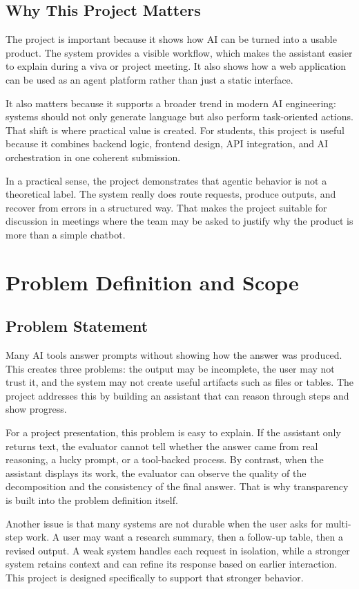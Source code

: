 \documentclass[11pt,oneside]{report}
\begin{document}
\section{Why This Project Matters}
The project is important because it shows how AI can be turned into a usable product. The system provides a visible workflow, which makes the assistant easier to explain during a viva or project meeting. It also shows how a web application can be used as an agent platform rather than just a static interface.

It also matters because it supports a broader trend in modern AI engineering: systems should not only generate language but also perform task-oriented actions. That shift is where practical value is created. For students, this project is useful because it combines backend logic, frontend design, API integration, and AI orchestration in one coherent submission.

In a practical sense, the project demonstrates that agentic behavior is not a theoretical label. The system really does route requests, produce outputs, and recover from errors in a structured way. That makes the project suitable for discussion in meetings where the team may be asked to justify why the product is more than a simple chatbot.

\chapter{Problem Definition and Scope}
\section{Problem Statement}
Many AI tools answer prompts without showing how the answer was produced. This creates three problems: the output may be incomplete, the user may not trust it, and the system may not create useful artifacts such as files or tables. The project addresses this by building an assistant that can reason through steps and show progress.

For a project presentation, this problem is easy to explain. If the assistant only returns text, the evaluator cannot tell whether the answer came from real reasoning, a lucky prompt, or a tool-backed process. By contrast, when the assistant displays its work, the evaluator can observe the quality of the decomposition and the consistency of the final answer. That is why transparency is built into the problem definition itself.

Another issue is that many systems are not durable when the user asks for multi-step work. A user may want a research summary, then a follow-up table, then a revised output. A weak system handles each request in isolation, while a stronger system retains context and can refine its response based on earlier interaction. This project is designed specifically to support that stronger behavior.
\end{document}
